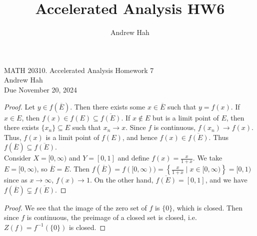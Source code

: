 \documentclass[11pt]{article}
\title{Accelerated Analysis HW6}
\author{Andrew Hah}
\begin{document}
\pagestyle{plain}
\begin{center}
{\Large MATH 20310. Accelerated Analysis Homework 7} \\ 
\vspace{.2in}  
Andrew Hah \\
Due November 20, 2024
\end{center}

\begin{exercise}{2}
    \begin{proof}
        Let $y \in f(\overline{E})$. Then there exists some $x \in \overline{E}$ such that $y = f(x)$. If $x \in E$, then $f(x) \in f(E) \subseteq \overline{f(E)}$. If $x \notin E$ but is a limit point of $E$, then there exists $\{ x_n \} \subseteq E$ such that $x_n \to x$. Since $f$ is continuous, $f(x_n) \to f(x)$. Thus, $f(x)$ is a limit point of $f(E)$, and hence $f(x) \in \overline{f(E)}$. Thus $f(\overline{E}) \subseteq \overline{f(E)}$. \\
        Consider $X = [0, \infty)$ and $Y = [0, 1]$ and define $f(x) = \frac{x}{1 + x}$. We take $E = [0, \infty)$, so $\overline{E} = E$. Then \( f(\overline{E}) = f([0, \infty)) = \left\{ \frac{x}{1 + x} \mid x \in [0, \infty) \right\} = [0,1) \) since as $x \to \infty$, $f(x) \to 1$. On the other hand, $\overline{f(E)} = [0, 1]$, and we have $f(\overline{E}) \subsetneq \overline{f(E)}$. 
    \end{proof}
\end{exercise}

\begin{exercise}{3}
    \begin{proof}
        We see that the image of the zero set of $f$ is $\{ 0 \}$, which is closed. Then since $f$ is continuous, the preimage of a closed set is closed, i.e. $Z(f) = f^{-1}(\{ 0 \})$ is closed. 
    \end{proof}
\end{exercise}
\end{document}
